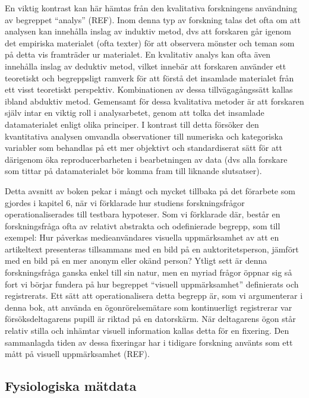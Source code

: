 \documentclass[
]{book}
\begin{document}
En viktig kontrast kan här hämtas från den kvalitativa forskningens användning av begreppet ``analys'' (REF). Inom denna typ av forskning talas det ofta om att analysen kan innehålla inslag av induktiv metod, dvs att forskaren går igenom det empiriska materialet (ofta texter) för att observera mönster och teman som på detta vis framträder ur materialet. En kvalitativ analys kan ofta även innehålla inslag av deduktiv metod, vilket innebär att forskaren använder ett teoretiskt och begreppsligt ramverk för att förstå det insamlade materialet från ett visst teoretiskt perspektiv. Kombinationen av dessa tillvägagångssätt kallas ibland abduktiv metod. Gemensamt för dessa kvalitativa metoder är att forskaren själv intar en viktig roll i analysarbetet, genom att tolka det insamlade datamaterialet enligt olika principer. I kontrast till detta försöker den kvantitativa analysen omvandla observationer till numeriska och kategoriska variabler som behandlas på ett mer objektivt och standardiserat sätt för att därigenom öka reproducerbarheten i bearbetningen av data (dvs alla forskare som tittar på datamaterialet bör komma fram till liknande slutsatser).

Detta avsnitt av boken pekar i mångt och mycket tillbaka på det förarbete som gjordes i kapitel 6, när vi förklarade hur studiens forskningsfrågor operationaliserades till testbara hypoteser. Som vi förklarade där, består en forskningsfråga ofta av relativt abstrakta och odefinierade begrepp, som till exempel: Hur påverkas medieanvändares visuella uppmärksamhet av att en artikeltext presenteras tillsammans med en bild på en auktoritetsperson, jämfört med en bild på en mer anonym eller okänd person? Ytligt sett är denna forskningsfråga ganska enkel till sin natur, men en myriad frågor öppnar sig så fort vi börjar fundera på hur begreppet ``visuell uppmärksamhet'' definierats och registrerats. Ett sätt att operationalisera detta begrepp är, som vi argumenterar i denna bok, att använda en ögonrörelsemätare som kontinuerligt registrerar var försöksdeltagarens pupill är riktad på en datorskärm. När deltagarens ögon står relativ stilla och inhämtar visuell information kallas detta för en fixering. Den sammanlagda tiden av dessa fixeringar har i tidigare forskning använts som ett mått på visuell uppmärksamhet (REF).

\hypertarget{sub07.7.1}{%
\subsection{Fysiologiska mätdata}\label{sub07.7.1}}
\end{document}
